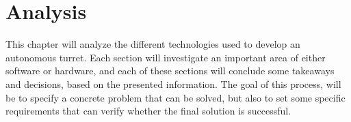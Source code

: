 \chapter{Analysis}
This chapter will analyze the different technologies used to develop an autonomous turret. 
Each section will investigate an important area of either software or hardware, and each of these sections will conclude some takeaways and decisions, based on the presented information.
The goal of this process, will be to specify a concrete problem that can be solved, but also to set some specific requirements that can verify whether the final solution is successful.








